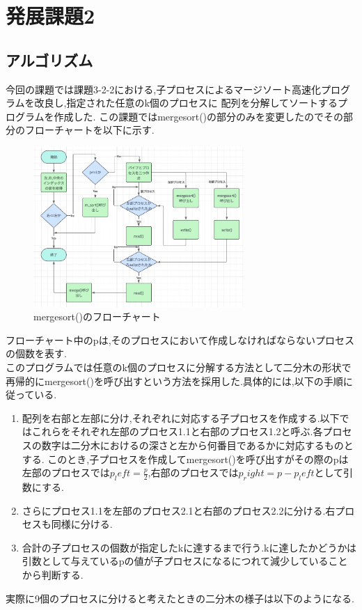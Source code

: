 \documentclass[dvipdfmx]{jarticle}
\begin{document}
\section{発展課題2}
\subsection{アルゴリズム}
今回の課題では課題3-2-2における,子プロセスによるマージソート高速化プログラムを改良し,指定された任意のk個のプロセスに
配列を分解してソートするプログラムを作成した.
この課題ではmergesort()の部分のみを変更したのでその部分のフローチャートを以下に示す.
\begin{figure}[h]
    \centering
    \includegraphics[width=8cm]{hatten2hurotya.png}
    \caption{mergesort()のフローチャート}
\end{figure}
フローチャート中のpは,そのプロセスにおいて作成しなければならないプロセスの個数を表す.\\
このプログラムでは任意のk個のプロセスに分解する方法として二分木の形状で再帰的にmergesort()を呼び出すという方法を採用した.具体的には,以下の手順に従っている.
\begin{enumerate}
    \item 配列を右部と左部に分け,それぞれに対応する子プロセスを作成する.以下ではこれらをそれぞれ左部のプロセス1.1と右部のプロセス1.2と呼ぶ.各プロセスの数字は二分木におけるの深さと左から何番目であるかに対応するものとする.
    このとき,子プロセスを作成してmergesort()を呼び出すがその際のpは左部のプロセスでは$p_left=\frac{p}{2}$,右部のプロセスでは$p_right=p-p_left$として引数にする.
    \item さらにプロセス1.1を左部のプロセス2.1と右部のプロセス2.2に分ける.右プロセスも同様に分ける.
    \item 合計の子プロセスの個数が指定したkに達するまで行う.kに達したかどうかは引数として与えているpの値が子プロセスになるにつれて減少していることから判断する.
\end{enumerate}
実際に9個のプロセスに分けると考えたときの二分木の様子は以下のようになる.\clearpage
\end{document}
